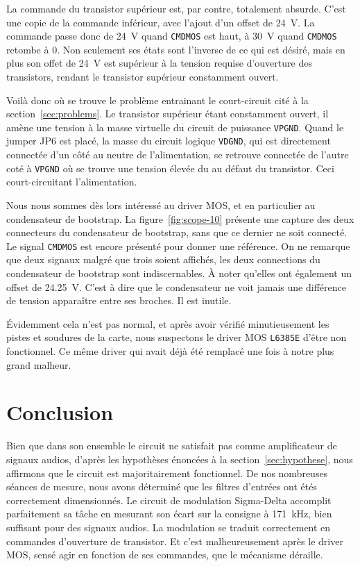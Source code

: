 \documentclass[10pt, oneside, a4paper]{article}
\begin{document}
La commande du transistor supérieur est, par contre, totalement absurde.
C'est une copie de la commande inférieur, avec l'ajout d'un offset de \SI{24}{\volt}.
La commande passe donc de \SI{24}{\volt} quand \texttt{CMDMOS} est haut, à \SI{30}{\volt} quand \texttt{CMDMOS} retombe à 0.
Non seulement ses états sont l'inverse de ce qui est désiré, mais en plus son offet de \SI{24}{\volt} est supérieur à la tension requise d'ouverture des transistors, rendant le transistor supérieur constamment ouvert.

Voilà donc où se trouve le problème entrainant le court-circuit cité à la section~\ref{sec:problems}.
Le transistor supérieur étant constamment ouvert, il amène une tension à la masse virtuelle du circuit de puissance \texttt{VPGND}.
Quand le jumper JP6 est placé, la masse du circuit logique \texttt{VDGND}, qui est directement connectée d'un côté au neutre de l'alimentation, se retrouve connectée de l'autre coté à \texttt{VPGND} où se trouve une tension élevée du au défaut du transistor.
Ceci court-circuitant l'alimentation.

Nous nous sommes dès lors intéressé au driver MOS, et en particulier au condensateur de bootstrap.
La figure~\ref{fig:scope-10} présente une capture des deux connecteurs du condensateur de bootstrap, sans que ce dernier ne soit connecté.
Le signal \texttt{CMDMOS} est encore présenté pour donner une référence.
On ne remarque que deux signaux malgré que trois soient affichés, les deux connections du condensateur de bootstrap sont indiscernables.
À noter qu'elles ont également un offset de \SI{24.25}{\volt}.
C'est à dire que le condensateur ne voit jamais une différence de tension apparaître entre 
ses broches.
Il est inutile.

Évidemment cela n'est pas normal, et après avoir vérifié minutieusement les pistes et soudures de la carte, nous suspectons le driver MOS \texttt{L6385E} d'être non fonctionnel.
Ce même driver qui avait déjà été remplacé une fois à notre plus grand malheur.


\section*{Conclusion}
Bien que dans son ensemble le circuit ne satisfait pas comme amplificateur de signaux audios, d'après les hypothèses énoncées à la section~\ref{sec:hypothese}, nous affirmons que le circuit est majoritairement fonctionnel.
De nos nombreuses séances de mesure, nous avons déterminé que les filtres d'entrées ont étés correctement dimensionnés.
Le circuit de modulation Sigma-Delta accomplit parfaitement sa tâche en mesurant son écart sur la consigne à \SI{171}{\kilo\hertz}, bien suffisant pour des signaux audios.
La modulation se traduit correctement en commandes d'ouverture de transistor.
Et c'est malheureusement après le driver MOS, sensé agir en fonction de ses commandes, que le mécanisme déraille.
\end{document}
